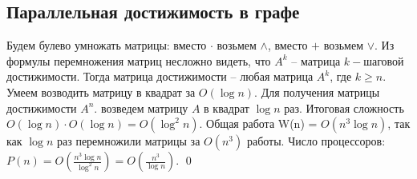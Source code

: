 \subsection{Параллельная достижимость в графе}

 Будем булево умножать матрицы: вместо $\cdot$ возьмем $\land$, вместо $+$ возьмем $\lor$. Из формулы перемножения матриц несложно видеть, что $A^k$ -- матрица $k-$шаговой достижимости. Тогда матрица достижимости -- любая матрица $A^k$, где $k\geq n$. Умеем возводить матрицу в квадрат за $O(\log n)$. Для получения матрицы достижимости $A^n$. возведем матрицу $A$ в квадрат $\log n$ раз. Итоговая сложность $O(\log n) \cdot O(\log n) = O(\log^2 n)$. Общая работа W(n) = $O(n^3\log n)$, так как $\log n$ раз перемножили матрицы за $O(n^3)$ работы. Число процессоров: $P(n) = O(\frac{n^3\log n}{\log^2 n}) = O(\frac{n^3}{\log n})$. \qed
